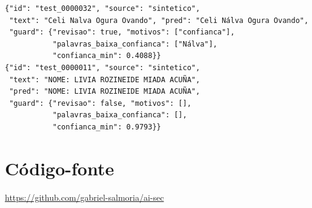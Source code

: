\documentclass[12pt,a4paper]{article}
\begin{document}
\begin{verbatim}
{"id": "test_0000032", "source": "sintetico",
 "text": "Celi Nalva Ogura Ovando", "pred": "Celi Nálva Ogura Ovando",
 "guard": {"revisao": true, "motivos": ["confianca"],
           "palavras_baixa_confianca": ["Nálva"],
           "confianca_min": 0.4088}}
{"id": "test_0000011", "source": "sintetico",
 "text": "NOME: LIVIA ROZINEIDE MIADA ACUÑA",
 "pred": "NOME: LIVIA ROZINEIDE MIADA ACUÑA",
 "guard": {"revisao": false, "motivos": [],
           "palavras_baixa_confianca": [],
           "confianca_min": 0.9793}}
\end{verbatim}

\section{Código-fonte}
\label{app:codigo}

\url{https://github.com/gabriel-salmoria/ai-sec}
\end{document}
